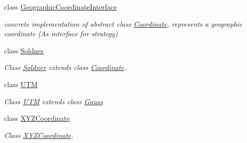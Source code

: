 \begin{DoxyCompactItemize}
\begin{DoxyCompactList}
 \end{DoxyCompactList}\item 
class \hyperlink{classcoordinates_1_1_geographic_coordinate_interface}{Geographic\+Coordinate\+Interface}
\begin{DoxyCompactList}\small\item\em concrete implementation of abstract class \hyperlink{classcoordinates_1_1_coordinate}{Coordinate}, represents a geographic coordinate (As interface for strategy)~\newline
 \end{DoxyCompactList}\item 
class \hyperlink{classcoordinates_1_1_soldner}{Soldner}
\begin{DoxyCompactList}\small\item\em Class \hyperlink{classcoordinates_1_1_soldner}{Soldner} extends class \hyperlink{classcoordinates_1_1_coordinate}{Coordinate}. \end{DoxyCompactList}\item 
class \hyperlink{classcoordinates_1_1_u_t_m}{U\+TM}
\begin{DoxyCompactList}\small\item\em Class \hyperlink{classcoordinates_1_1_u_t_m}{U\+TM} extends class \hyperlink{classcoordinates_1_1_gauss}{Gauss}. \end{DoxyCompactList}\item 
class \hyperlink{classcoordinates_1_1_x_y_z_coordinate}{X\+Y\+Z\+Coordinate}
\begin{DoxyCompactList}\small\item\em Class \hyperlink{classcoordinates_1_1_x_y_z_coordinate}{X\+Y\+Z\+Coordinate}. \end{DoxyCompactList}\end{DoxyCompactItemize}
